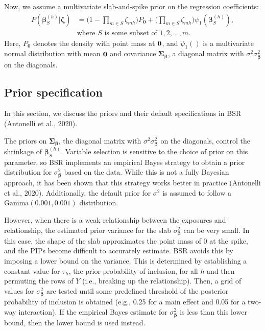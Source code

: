 \documentclass[12pt, twoside]{amherstthesis}
\begin{document}
Now, we assume a multivariate slab-and-spike prior on the regression coefficients:
\begin{align*}
P(\boldsymbol\beta_S^{(h)}|\boldsymbol\zeta) &= \bigg(1-\prod_{m\in S}\zeta_{mh}\bigg)P_{\textbf{0}} +
\bigg(\prod_{m\in S}\zeta_{mh}\bigg) \psi_1(\boldsymbol\beta_S^{(h)}), \\
&\textrm{where } S \textrm{ is some subset of } {1, 2, \dots, m}.
\end{align*}
\noindent Here, \(P_{\textbf{0}}\) denotes the density with point mass at \(\textbf0\), and \(\psi_1()\) is a multivariate normal distribution with mean \(\textbf0\) and covariance \(\boldsymbol\Sigma_{\boldsymbol\beta}\), a diagonal matrix with \(\sigma^2\sigma_{\boldsymbol\beta}^2\) on the diagonals.

\hypertarget{prior-specification-1}{%
\subsection{Prior specification}\label{prior-specification-1}}

In this section, we discuss the priors and their default specifications in BSR (Antonelli et al., 2020).

The priors on \(\boldsymbol\Sigma_{\boldsymbol\beta}\), the diagonal matrix with \(\sigma^2\sigma^2_{\boldsymbol\beta}\) on the diagonals, control the shrinkage of \(\boldsymbol\beta_S^{(h)}\). Variable selection is sensitive to the choice of prior on this parameter, so BSR implements an empirical Bayes strategy to obtain a prior distribution for \(\sigma^2_{\boldsymbol\beta}\) based on the data. While this is not a fully Bayesian approach, it has been shown that this strategy works better in practice (Antonelli et al., 2020). Additionally, the default prior for \(\sigma^2\) is assumed to follow a \(\textrm{Gamma}(0.001, 0.001)\) distribution.

However, when there is a weak relationship between the exposures and relationship, the estimated prior variance for the slab \(\sigma^2_{\boldsymbol\beta}\) can be very small. In this case, the shape of the slab approximates the point mass of 0 at the spike, and the PIPs become difficult to accurately estimate. BSR avoids this by imposing a lower bound on the variance. This is determined by establishing a constant value for \(\tau_h\), the prior probability of inclusion, for all \(h\) and then permuting the rows of \(Y\) (i.e., breaking up the relationship). Then, a grid of values for \(\sigma^2_{\boldsymbol\beta}\) are tested until some predefined threshold of the posterior probability of inclusion is obtained (e.g., 0.25 for a main effect and 0.05 for a two-way interaction). If the empirical Bayes estimate for \(\sigma^2_{\boldsymbol\beta}\) is less than this lower bound, then the lower bound is used instead.
\end{document}
